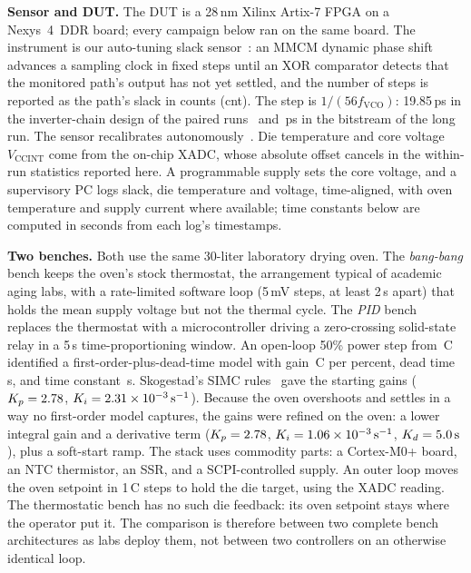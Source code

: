 \documentclass[10pt,twocolumn]{article}
\newcommand{\degC}{\,\textdegree C}
\newcommand{\unit}[1]{\,\mathrm{#1}}
\begin{document}
\textbf{Sensor and DUT.} The DUT is a 28\,nm Xilinx Artix-7 FPGA on a Nexys~4~DDR board; every campaign below ran on the same board. The instrument is our auto-tuning slack sensor~\cite{sbcci25}: an MMCM dynamic phase shift advances a sampling clock in fixed steps until an XOR comparator detects that the monitored path's output has not yet settled, and the number of steps is reported as the path's slack in counts (cnt). The step is $1/(56f_{\mathrm{VCO}})$: 19.85\,ps in the inverter-chain design of the paired runs~\cite{sbcci26} and \vPsRCA\,ps in the bitstream of the long run. The sensor recalibrates autonomously~\cite{sbcci25}. Die temperature and core voltage $V_{\mathrm{CCINT}}$ come from the on-chip XADC, whose absolute offset cancels in the within-run statistics reported here. A programmable supply sets the core voltage, and a supervisory PC logs slack, die temperature and voltage, time-aligned, with oven temperature and supply current where available; time constants below are computed in seconds from each log's timestamps.

\textbf{Two benches.} Both use the same 30-liter laboratory drying oven. The \emph{bang-bang} bench keeps the oven's stock thermostat, the arrangement typical of academic aging labs, with a rate-limited software loop (5\,mV steps, at least 2\,s apart) that holds the mean supply voltage but not the thermal cycle. The \emph{PID} bench replaces the thermostat with a microcontroller driving a zero-crossing solid-state relay in a 5\,s time-proportioning window. An open-loop 50\% power step from \vFopdtTzero\degC{} identified a first-order-plus-dead-time model with gain \vFopdtK\degC{} per percent, dead time \vFopdtTheta\,s, and time constant \vFopdtTau\,s. Skogestad's SIMC rules~\cite{simc} gave the starting gains ($K_p=2.78$, $K_i=\vSimcKiE\times10^{-3}\unit{s^{-1}}$). Because the oven overshoots and settles in a way no first-order model captures, the gains were refined on the oven: a lower integral gain and a derivative term ($K_p=2.78$, $K_i=\vFinalKiE\times10^{-3}\unit{s^{-1}}$, $K_d=\vFinalKd\unit{s}$), plus a soft-start ramp. The stack uses commodity parts: a Cortex-M0+ board, an NTC thermistor, an SSR, and a SCPI-controlled supply. An outer loop moves the oven setpoint in 1\degC{} steps to hold the die target, using the XADC reading. The thermostatic bench has no such die feedback: its oven setpoint stays where the operator put it. The comparison is therefore between two complete bench architectures as labs deploy them, not between two controllers on an otherwise identical loop.
\end{document}
